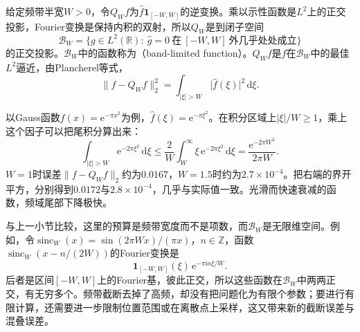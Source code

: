 给定频带半宽$W>0$，令$Q_Wf$为$\hat f\mathbf 1_{[-W,W]}$的逆变换。乘以示性函数是$L^2$上的正交投影，Fourier变换是保持内积的双射，所以$Q_W$是到闭子空间
\[
 \mathcal B_W=\bigl\{g\in L^2(\mathbb R):\ \hat g=0\ \text{在}\ [-W,W]\ \text{外几乎处处成立}\bigr\}
\]
的正交投影。$\mathcal B_W$中的函数称为（band-limited function）。$Q_Wf$是$f$在$\mathcal B_W$中的最佳$L^2$逼近，由Plancherel等式，
\begin{equation}
 \lVert f-Q_Wf\rVert_2^2=\int_{\lvert\xi\rvert>W}\lvert\hat f(\xi)\rvert^2\,\mathrm d\xi .
 \label{eq:fapprox-band-tail}
\end{equation}

以Gauss函数$f(x)=\mathrm e^{-\pi x^2}$为例，$\hat f(\xi)=\mathrm e^{-\pi\xi^2}$。在积分区域上$\lvert\xi\rvert/W\geq1$，乘上这个因子可以把尾积分算出来：
\[
 \int_{\lvert\xi\rvert>W}\mathrm e^{-2\pi\xi^2}\,\mathrm d\xi\leq\frac2W\int_W^\infty\xi\,\mathrm e^{-2\pi\xi^2}\,\mathrm d\xi=\frac{\mathrm e^{-2\pi W^2}}{2\pi W}.
\]
$W=1$时误差$\lVert f-Q_Wf\rVert_2$约为$0.0167$，$W=1.5$时约为$2.7\times10^{-4}$。把右端的界开平方，分别得到$0.0172$与$2.8\times10^{-4}$，几乎与实际值一致。光滑而快速衰减的函数，频域尾部下降极快。

与上一小节比较，这里的预算是频带宽度而不是项数，而$\mathcal B_W$是无限维空间。例如，令$\operatorname{sinc}_W(x)=\sin(2\pi Wx)/(\pi x)$，$n\in\mathbb Z$，函数$\operatorname{sinc}_W(x-n/(2W))$的Fourier变换是
\[
 \mathbf 1_{[-W,W]}(\xi)\,\mathrm e^{-\pi\mathrm in\xi/W}.
\]
后者是区间$[-W,W]$上的Fourier基，彼此正交，所以这些函数在$\mathcal B_W$中两两正交，有无穷多个。频带截断去掉了高频，却没有把问题化为有限个参数；要进行有限计算，还需要进一步限制位置范围或在离散点上采样，这又带来新的截断误差与混叠误差。
